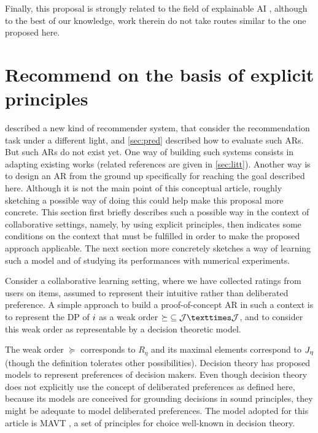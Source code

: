 \documentclass[version=3.21, pagesize, twoside=off, bibliography=totoc, DIV=calc, fontsize=12pt, a4paper, french, english]{scrartcl}
\begin{document}
Finally, this proposal is strongly related to the field of explainable AI \citep{DBLP:journals/corr/abs-1804-11192}, although to the best of our knowledge, work therein do not take routes similar to the one proposed here.

\section{Recommend on the basis of explicit principles}
\label{sec:princ}
 described a new kind of recommender system, that consider the recommendation task under a different light, and \cref{sec:pred} described how to evaluate such \acp{AR}. But such \acp{AR} do not exist yet. One way of building such systems consists in adapting existing works (related references are given in \cref{sec:litt}). Another way is to design an \ac{AR} from the ground up specifically for reaching the goal described here. Although it is not the main point of this conceptual article, roughly sketching a possible way of doing this could help make this proposal more concrete. This section first briefly describes such a possible way in the context of collaborative settings, namely, by using explicit principles, then indicates some conditions on the context that must be fulfilled in order to make the proposed approach applicable. The next section more concretely sketches a way of learning such a model and of studying its performances with numerical experiments.

Consider a collaborative learning setting, where we have collected ratings from users on items, assumed to represent their intuitive rather than deliberated preference. 
A simple approach to build a proof-of-concept \ac{AR} in such a context is to represent the \ac{DP} of $i$ as a weak order ${\succeq} \subseteq \allitems × \allitems$, and to consider this weak order as representable by a decision theoretic model.

The weak order ${\succeq}$ corresponds to $R_\eta$ and its maximal elements correspond to $J_{\eta}$ (though the definition tolerates other possibilities). Decision theory has proposed models to represent preferences of decision makers. Even though decision theory does not explicitly use the concept of deliberated preferences as defined here, because its models are conceived for grounding decisions in sound principles, they might be adequate to model deliberated preferences. 
The model adopted for this article is \ac{MAVT} \citep{keeney_decisions_1993}, a set of principles for choice well-known in decision theory.
\end{document}
